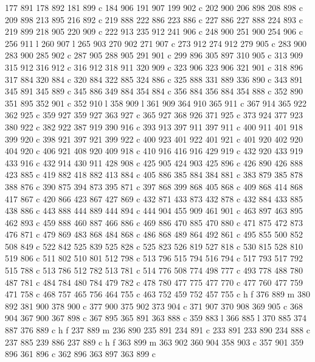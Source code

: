 {{   177 891 178 892 181 899 c
   184 906 191 907 199 902 c
   202 900 206 898 208 898 c
   209 898 213 895 216 892 c
   219 888 222 886 223 886 c
   227 886 227 888 224 893 c
   219 899 218 905 220 909 c
   222 913 235 912 241 906 c
   248 900 251 900 254 906 c
   256 911 l
   260 907 l
   265 903 270 902 271 907 c
   273 912 274 912 279 905 c
   283 900 283 900 285 902 c
   287 905 288 905 291 901 c
   299 896 305 897 310 905 c
   313 909 315 912 316 912 c
   316 912 318 911 320 909 c
   323 906 323 906 321 901 c
   318 896 317 884 320 884 c
   320 884 322 885 324 886 c
   325 888 331 889 336 890 c
   343 891 345 891 345 889 c
   345 886 349 884 354 884 c
   356 884 356 884 354 888 c
   352 890 351 895 352 901 c
   352 910 l
   358 909 l
   361 909 364 910 365 911 c
   367 914 365 922 362 925 c
   359 927 359 927 363 927 c
   365 927 368 926 371 925 c
   373 924 377 923 380 922 c
   382 922 387 919 390 916 c
   393 913 397 911 397 911 c
   400 911 401 918 399 920 c
   398 921 397 921 399 922 c
   400 923 401 922 401 921 c
   401 920 402 920 404 920 c
   406 921 408 920 409 918 c
   410 916 416 916 429 919 c
   432 920 433 919 433 916 c
   432 914 430 911 428 908 c
   425 905 424 903 425 896 c
   426 890 426 888 423 885 c
   419 882 418 882 413 884 c
   405 886 385 884 384 881 c
   383 879 385 878 388 876 c
   390 875 394 873 395 871 c
   397 868 399 868 405 868 c
   409 868 414 868 417 867 c
   420 866 423 867 427 869 c
   432 871 433 873 432 878 c
   432 884 433 885 438 886 c
   443 888 444 889 444 894 c
   444 904 455 909 461 901 c
   463 897 463 895 462 893 c
   459 888 460 887 466 886 c
   469 886 470 885 470 880 c
   471 875 472 873 476 871 c
   479 869 483 868 484 868 c
   486 868 489 864 492 861 c
   495 855 500 852 508 849 c
   522 842 525 839 525 828 c
   525 823 526 819 527 818 c
   530 815 528 810 519 806 c
   511 802 510 801 512 798 c
   513 796 515 794 516 794 c
   517 793 517 792 515 788 c
   513 786 512 782 513 781 c
   514 776 508 774 498 777 c
   493 778 488 780 487 781 c
   484 784 480 784 479 782 c
   478 780 477 775 477 770 c
   477 760 477 759 471 758 c
   468 757 465 756 464 755 c
   463 752 459 752 457 755 c
   h f
   376 889 m
   380 892 381 900 378 900 c
   377 900 375 902 373 904 c
   371 907 370 908 369 905 c
   368 904 367 900 367 898 c
   367 895 365 891 363 888 c
   359 883 l
   366 885 l
   370 885 374 887 376 889 c
   h f
   237 889 m
   236 890 235 891 234 891 c
   233 891 233 890 234 888 c
   237 885 239 886 237 889 c
   h f
   363 899 m
   363 902 360 904 358 903 c
   357 901 359 896 361 896 c
   362 896 363 897 363 899 c
}}
